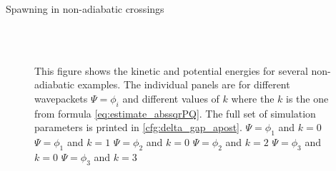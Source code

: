 \begin{chapter}{Spawning in non-adiabatic crossings}
\begin{figure}[h!]
{  } \\
   \\
  \caption[The kinetic and potential energies for several non-adiabatic examples]{
  This figure shows the kinetic and potential energies for several non-adiabatic examples.
  The individual panels are for different wavepackets $\Psi = \phi_i$ and different
  values of $k$ where the $k$ is the one from formula \eqref{eq:estimate_abssqrPQ}.
  The full set of simulation parameters is printed in \ref{cfg:delta_gap_apost}.
   $\Psi = \phi_1$ and $k=0$
   $\Psi = \phi_1$ and $k=1$
   $\Psi = \phi_2$ and $k=0$
   $\Psi = \phi_2$ and $k=2$
   $\Psi = \phi_3$ and $k=0$
   $\Psi = \phi_3$ and $k=3$
  \label{fig:spawn_delta_gap_energies1}
  }
\end{figure}



\end{chapter}
